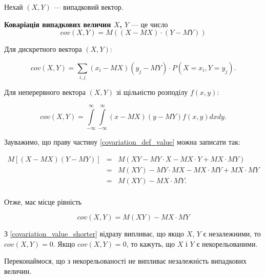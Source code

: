 Нехай $(X, Y)$ --- випадковий вектор.

\begin{definition}
    \textbf{Коваріація випадкових величин $X$, $Y$}  --- це число 
    \begin{equation}
    \label{covariation_def_value}
        cov(X, Y) = M((X - MX) \cdot (Y - MY))
    \end{equation}
\end{definition}

Для дискретного вектора $(X, Y)$:

$$cov(X, Y) = \sum\limits_{i, j} (x_i - MX)(y_j - MY) \cdot P(X=x_i, Y=y_j).$$

Для неперервного вектора $(X, Y)$ зі щільністю розподілу $f(x, y)$:

$$cov(X, Y) = \int\limits_{-\infty}^{\infty} \int\limits_{-\infty}^{\infty} (x - MX)(y - MY) f(x, y) dx dy.$$

Зауважимо, що праву частину \ref{covariation_def_value}
можна записати так:

$$\begin{array}{rcl}
    M[(X-MX)(Y-MY)] & = & M(XY - MY \cdot X - MX \cdot Y + MX \cdot MY) \\
    & = & M(XY) - MY \cdot MX - MX \cdot MY + MX \cdot MY \\
    & = & M(XY) - MX \cdot MY. \\
\end{array}$$

Отже, має місце рівність

\begin{equation}
    \label{covariation_value_shorter}
    cov(X, Y) = M(XY) - MX \cdot MY
\end{equation}

З \ref{covariation_value_shorter} відразу
випливає, що якщо $X$, $Y$ є незалежними,
то $cov(X, Y) = 0$.
Якщо $cov(X, Y) = 0$, то кажуть, що $X$ і $Y$
є некорельованими.

Переконаймося, що з некорельованості не
випливає незалежність випадкових величин.

